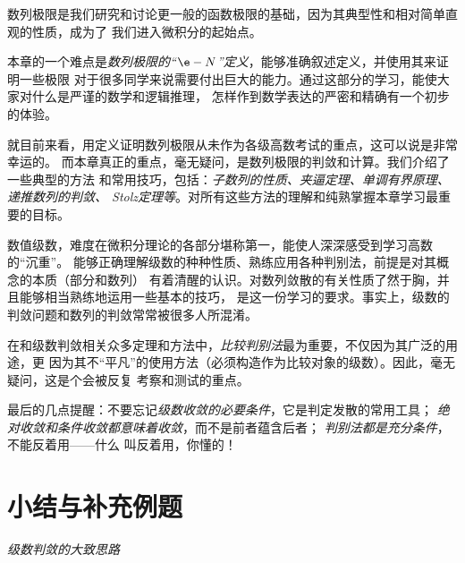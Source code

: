 数列极限是我们研究和讨论更一般的函数极限的基础，因为其典型性和相对简单直观的性质，成为了
我们进入微积分的起始点。

本章的一个难点是{\it 数列极限的“$\e-N$”定义}，能够准确叙述定义，并使用其来证明一些极限
对于很多同学来说需要付出巨大的能力。通过这部分的学习，能使大家对什么是严谨的数学和逻辑推理，
怎样作到数学表达的严密和精确有一个初步的体验。

就目前来看，用定义证明数列极限从未作为各级高数考试的重点，这可以说是非常幸运的。
而本章真正的重点，毫无疑问，是数列极限的判敛和计算。我们介绍了一些典型的方法
和常用技巧，包括：{\it 子数列的性质、夹逼定理、单调有界原理、递推数列的判敛、
Stolz定理等}。对所有这些方法的理解和纯熟掌握本章学习最重要的目标。

数值级数，难度在微积分理论的各部分堪称第一，能使人深深感受到学习高数的“沉重”。
能够正确理解级数的种种性质、熟练应用各种判别法，前提是对其概念的本质（部分和数列）
有着清醒的认识。对数列敛散的有关性质了然于胸，并且能够相当熟练地运用一些基本的技巧，
是这一份学习的要求。事实上，级数的判敛问题和数列的判敛常常被很多人所混淆。

在和级数判敛相关众多定理和方法中，{\it 比较判别法}最为重要，不仅因为其广泛的用途，更
因为其不“平凡”的使用方法（必须构造作为比较对象的级数）。因此，毫无疑问，这是个会被反复
考察和测试的重点。

最后的几点提醒：不要忘记{\it 级数收敛的必要条件}，它是判定发散的常用工具；
{\it 绝对收敛和条件收敛都意味着收敛}，而不是前者蕴含后者；{\it
判别法都是充分条件}，不能反着用——什么 叫反着用，你懂的！

\newpage

\section*{小结与补充例题}

\begin{center}
	
	{\it 级数判敛的大致思路}
\end{center}

